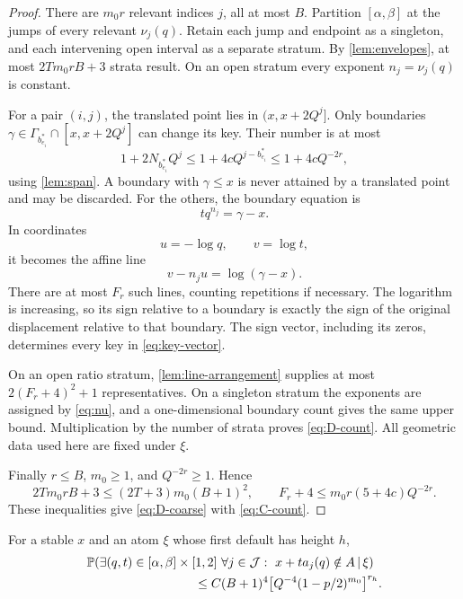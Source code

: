 \begin{proof}
There are $m_0r$ relevant indices $j$, all at most $B$.
Partition $[\alpha,\beta]$ at the jumps of every relevant
$\nu_j(q)$. Retain each jump and endpoint as a singleton, and each
intervening open interval as a separate stratum. By
\cref{lem:envelopes}, at most $2Tm_0rB+3$ strata result.
On an open stratum every exponent $n_j=\nu_j(q)$ is constant.

For a pair $(i,j)$, the translated point lies in $(x,x+2Q^j]$.
Only boundaries $\gamma\in\Gamma_{b_{e_i}^*}\cap[x,x+2Q^j]$
can change its key. Their number is at most
\begin{equation}\label{eq:boundary-count}
 1+2N_{b_{e_i}^*}Q^j
 \le1+4cQ^{j-b_{e_i}^*}
 \le1+4cQ^{-2r},
\end{equation}
using \cref{lem:span}. A boundary with $\gamma\le x$ is never
attained by a translated point and may be discarded. For the others,
the boundary equation is
\[
 tq^{n_j}=\gamma-x.
\]
In coordinates
\begin{equation}\label{eq:log-coordinates}
 u=-\log q,\qquad v=\log t,
\end{equation}
it becomes the affine line
\begin{equation}\label{eq:boundary-line}
 v-n_ju=\log(\gamma-x).
\end{equation}
There are at most $F_r$ such lines, counting repetitions if necessary.
The logarithm is increasing, so its sign relative to a boundary is
exactly the sign of the original displacement relative to that boundary.
The sign vector, including its zeros, determines every key in
\eqref{eq:key-vector}.

On an open ratio stratum, \cref{lem:line-arrangement} supplies at most
$2(F_r+4)^2+1$ representatives. On a singleton stratum the exponents
are assigned by \eqref{eq:nu}, and a one-dimensional boundary count
gives the same upper bound. Multiplication by the number of strata
proves \eqref{eq:D-count}. All geometric data used here are fixed
under $\xi$.

Finally $r\le B$, $m_0\ge1$, and $Q^{-2r}\ge1$. Hence
\[
 2Tm_0rB+3\le(2T+3)m_0(B+1)^2,
 \qquad
 F_r+4\le m_0r(5+4c)Q^{-2r}.
\]
These inequalities give \eqref{eq:D-coarse} with \eqref{eq:C-count}.
\end{proof}

\begin{proposition}\label{prop:uniform-failure}
For a stable $x$ and an atom $\xi$ whose first default has height $h$,
\begin{align}
 &\Prob\!\left(\exists(q,t)\in[\alpha,\beta]\times[1,2]
   \ \forall j\in\mathcal J:\ x+ta_j(q)\notin A
   \,\middle|\,\xi\right)\notag\\
 &\hspace{30mm}\le C(B+1)^4
  \bigl[Q^{-4}(1-p/2)^{m_0}\bigr]^{r_h}.
 \label{eq:uniform-failure}
\end{align}
\end{proposition}

